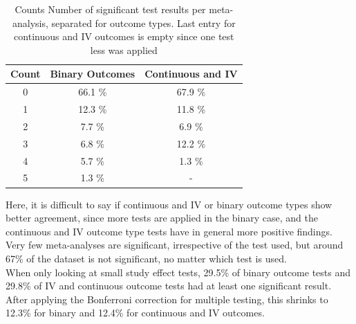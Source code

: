 \documentclass[11pt,a4paper,twoside]{book}\usepackage[]{graphicx}\usepackage[]{color}
\begin{document}
\begin{table}[ht]
\centering
\begingroup\footnotesize
\begin{tabular}{ccc}
  \hline
Count & Binary Outcomes & Continuous and IV \\ 
  \hline
0 & 66.1 \% & 67.9 \% \\ 
  1 & 12.3 \% & 11.8 \% \\ 
  2 & 7.7 \% & 6.9 \% \\ 
  3 & 6.8 \% & 12.2 \% \\ 
  4 & 5.7 \% & 1.3 \% \\ 
  5 & 1.3 \% & - \\ 
   \hline
\end{tabular}
\endgroup
\caption{Counts Number of significant test results per meta-analysis, separated
       for outcome types. Last entry for continuous and IV outcomes is empty since one test less was 
       applied} 
\label{number.sig.tests}
\end{table}


Here, it is difficult to say if continuous and IV or binary outcome types show better agreement, since more tests are applied in the binary case, and the continuous and IV outcome type tests have in general more positive findings. Very few meta-analyses are significant, irrespective of the test used, but around 67\% of the dataset is not significant, no matter which test is used. \\
When only looking at small study effect tests, 29.5\% of binary outcome tests and 29.8\% of IV and continuous outcome tests had at least one significant result. After applying the Bonferroni correction for multiple testing, this shrinks to 12.3\% for binary and 12.4\% for continuous and IV outcomes. \\
\end{document}
